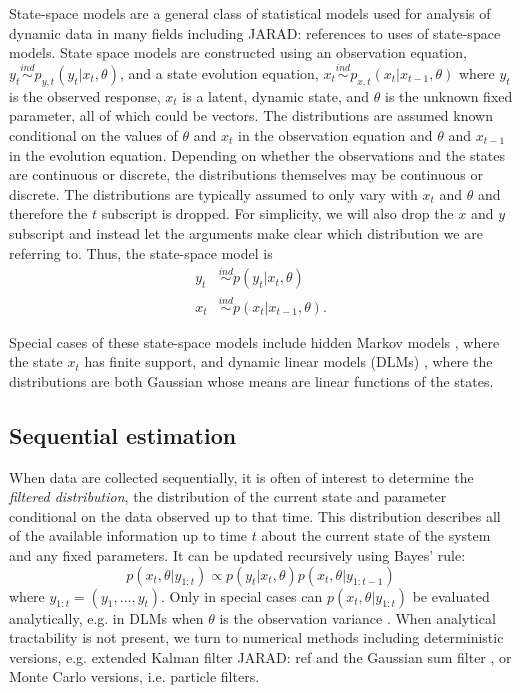 \documentclass{elsarticle}
\newcommand{\jarad}[1]{{\color{red}JARAD: #1}}
\begin{document}
State-space models are a general class of statistical models used for analysis of dynamic data in many fields including \jarad{references to uses of state-space models}. State space models are constructed using an observation equation, $y_t \stackrel{ind}{\sim} p_{y,t}(y_t|x_t,\theta)$, and a state evolution equation, $x_t \stackrel{ind}{\sim} p_{x,t}(x_t|x_{t-1},\theta)$ where $y_t$ is the observed response, $x_t$ is a latent, dynamic state, and $\theta$ is the unknown fixed parameter, all of which could be vectors. The distributions are assumed known conditional on the values of $\theta$ and $x_t$ in the observation equation and $\theta$ and $x_{t-1}$ in the evolution equation. Depending on whether the observations and the states are continuous or discrete, the distributions themselves may be continuous or discrete. The distributions are typically assumed to only vary with $x_t$ and $\theta$ and therefore the $t$ subscript is dropped.
For simplicity, we will also drop the $x$ and $y$ subscript and instead let the arguments make clear which distribution we are referring to. Thus, the state-space model is
\begin{align*}
y_t &\stackrel{ind}{\sim} p(y_t|x_t,\theta) \\
x_t &\stackrel{ind}{\sim} p(x_t|x_{t-1},\theta).
\end{align*}

Special cases of these state-space models include hidden Markov models \citep{cappe2005inference}, where the state $x_t$ has finite support, and dynamic linear models (DLMs) \citep{West:Harr:baye:1997}, where the distributions are both Gaussian whose means are linear functions of the states.

\subsection{Sequential estimation}

When data are collected sequentially, it is often of interest to determine the \emph{filtered distribution}, the distribution of the current state and parameter conditional on the data observed up to that time. This distribution describes all of the available information up to time $t$ about the current state of the system and any fixed parameters. It can be updated recursively using Bayes' rule:
\begin{equation}
p(x_t,\theta| y_{1:t}) \propto p(y_t|x_t,\theta)p(x_t,\theta|y_{1:t-1}) \label{eqn:filtered}
\end{equation}
where $y_{1:t} = (y_1,\ldots,y_t)$. Only in special cases can $p(x_t,\theta| y_{1:t})$ be evaluated analytically, e.g. in DLMs when $\theta$ is the observation variance \cite[Sec 4.3,][]{petris2009dynamic}. When analytical tractability is not present, we turn to numerical methods including deterministic versions, e.g. extended Kalman filter \jarad{ref} and the Gaussian sum filter \citep{Alsp:Sore:nonl:1972}, or Monte Carlo versions, i.e. particle filters.
\end{document}
